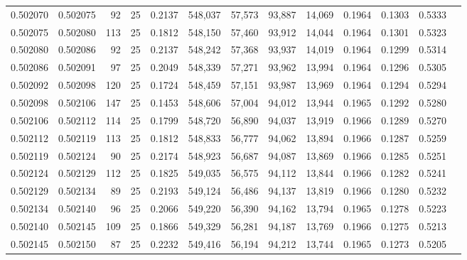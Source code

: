 \begin{tabular}{rrrrrrrrrrrrr}
0.502070 & 0.502075 &  92 &  25 &                                     0.2137 & 548,037 &  57,573 &  93,887 &  14,069 & 0.1964 & 0.1303 & 0.5333 \\
0.502075 & 0.502080 & 113 &  25 &                                     0.1812 & 548,150 &  57,460 &  93,912 &  14,044 & 0.1964 & 0.1301 & 0.5323 \\
0.502080 & 0.502086 &  92 &  25 &                                     0.2137 & 548,242 &  57,368 &  93,937 &  14,019 & 0.1964 & 0.1299 & 0.5314 \\
0.502086 & 0.502091 &  97 &  25 &                                     0.2049 & 548,339 &  57,271 &  93,962 &  13,994 & 0.1964 & 0.1296 & 0.5305 \\
0.502092 & 0.502098 & 120 &  25 &                                     0.1724 & 548,459 &  57,151 &  93,987 &  13,969 & 0.1964 & 0.1294 & 0.5294 \\
0.502098 & 0.502106 & 147 &  25 &                                     0.1453 & 548,606 &  57,004 &  94,012 &  13,944 & 0.1965 & 0.1292 & 0.5280 \\
0.502106 & 0.502112 & 114 &  25 &                                     0.1799 & 548,720 &  56,890 &  94,037 &  13,919 & 0.1966 & 0.1289 & 0.5270 \\
0.502112 & 0.502119 & 113 &  25 &                                     0.1812 & 548,833 &  56,777 &  94,062 &  13,894 & 0.1966 & 0.1287 & 0.5259 \\
0.502119 & 0.502124 &  90 &  25 &                                     0.2174 & 548,923 &  56,687 &  94,087 &  13,869 & 0.1966 & 0.1285 & 0.5251 \\
0.502124 & 0.502129 & 112 &  25 &                                     0.1825 & 549,035 &  56,575 &  94,112 &  13,844 & 0.1966 & 0.1282 & 0.5241 \\
0.502129 & 0.502134 &  89 &  25 &                                     0.2193 & 549,124 &  56,486 &  94,137 &  13,819 & 0.1966 & 0.1280 & 0.5232 \\
0.502134 & 0.502140 &  96 &  25 &                                     0.2066 & 549,220 &  56,390 &  94,162 &  13,794 & 0.1965 & 0.1278 & 0.5223 \\
0.502140 & 0.502145 & 109 &  25 &                                     0.1866 & 549,329 &  56,281 &  94,187 &  13,769 & 0.1966 & 0.1275 & 0.5213 \\
0.502145 & 0.502150 &  87 &  25 &                                     0.2232 & 549,416 &  56,194 &  94,212 &  13,744 & 0.1965 & 0.1273 & 0.5205 \\

\end{tabular}
